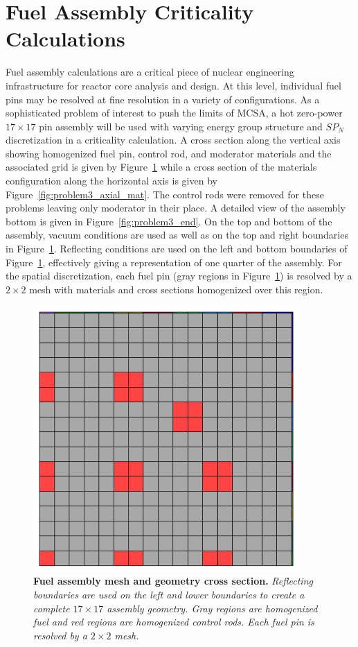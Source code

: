 \section{Fuel Assembly Criticality Calculations}
\label{sec:fuel_assembly_calcs}
Fuel assembly calculations are a critical piece of nuclear engineering
infrastructure for reactor core analysis and design. At this level,
individual fuel pins may be resolved at fine resolution in a variety
of configurations. As a sophisticated problem of interest to push the
limits of MCSA, a hot zero-power $17 \times 17$ pin assembly will be
used with varying energy group structure and $SP_N$ discretization in
a criticality calculation. A cross section along the vertical axis
showing homogenized fuel pin, control rod, and moderator materials and
the associated grid is given by Figure~\ref{fig:problem3_radial_mat}
while a cross section of the materials configuration along the
horizontal axis is given by Figure~\ref{fig:problem3_axial_mat}. The
control rods were removed for these problems leaving only moderator in
their place. A detailed view of the assembly bottom is given in
Figure~\ref{fig:problem3_end}. On the top and bottom of the assembly,
vacuum conditions are used as well as on the top and right boundaries
in Figure~\ref{fig:problem3_radial_mat}. Reflecting conditions are
used on the left and bottom boundaries of
Figure~\ref{fig:problem3_radial_mat}, effectively giving a
representation of one quarter of the assembly. For the spatial
discretization, each fuel pin (gray regions in
Figure~\ref{fig:problem3_radial_mat}) is resolved by a $2 \times 2$
mesh with materials and cross sections homogenized over this region.
\begin{figure}[t!]
  \begin{center}
    \includegraphics[width=4in]{chapters/spn_equations/problem3_radial_mat.png}
  \end{center}
  \caption{\textbf{Fuel assembly mesh and geometry cross section.}
    \textit{Reflecting boundaries are used on the left and lower
      boundaries to create a complete $17 \times 17$ assembly
      geometry. Gray regions are homogenized fuel and red regions are
      homogenized control rods. Each fuel pin is resolved by a $2
      \times 2$ mesh.}}
  \label{fig:problem3_radial_mat}
\end{figure}

